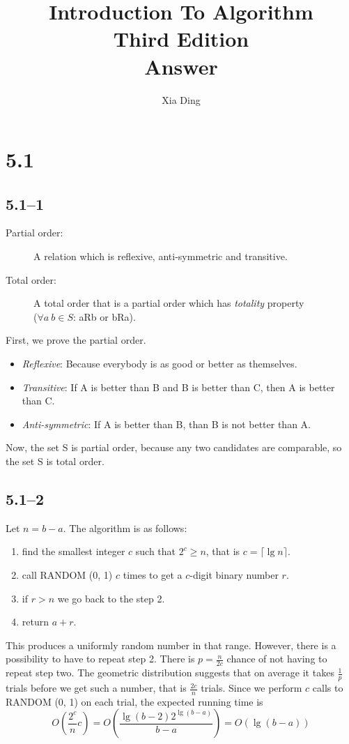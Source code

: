 \documentclass{article}
\author{Xia Ding}
\title{\textbf{Introduction To Algorithm}\\Third Edition\\\textbf{Answer}}
\begin{document}
\maketitle
\section*{5.1}
\subsection*{5.1--1}
\begin{description}
\item[Partial order:] A relation which is reflexive, anti-symmetric and
  transitive.
\item[Total order:] A total order that is a partial order which has
  \textit{totality} property\\($\forall a~b \in S$: aRb or bRa).
\end{description}
First, we prove the partial order.
\begin{itemize}
\item \textit{Reflexive}: Because everybody is as good or better as themselves.
\item \textit{Transitive}: If A is better than B and B is better than C, then A
  is better than C.
\item \textit{Anti-symmetric}: If A is better than B, than B is not better than A.
\end{itemize}
 Now, the set S is partial order, because any two candidates are comparable, so
 the set S is total order.

\subsection*{5.1--2}
Let $n = b - a$. The algorithm is as follows:
\begin{enumerate}
\item find the smallest integer $c$ such that $2^c \ge n$, that is $c =
  \lceil{\lg n}  \rceil$.
\item call RANDOM (0, 1) $c$ times to get a $c$-digit binary number $r$.
\item if $r > n$ we go back to the step 2.
\item return $a + r$.
\end{enumerate}
This produces a uniformly random number in that range. However, there is a
possibility to have to repeat step 2. There is $p=\frac{n}{2c}$ chance of not
having to repeat step two. The geometric distribution suggests that on average
it takes $\frac{1}{p}$ trials before we get such a number, that is
$\frac{2c}{n}$ trials. Since we perform $c$ calls to RANDOM (0, 1) on each trial,
the expected running time is
\[O(\frac{2^c}{n}c) = O(\frac{\lg (b-2)2^{\lg (b-a)}}{b-a}) = O(\lg (b-a))\]
\end{document}
